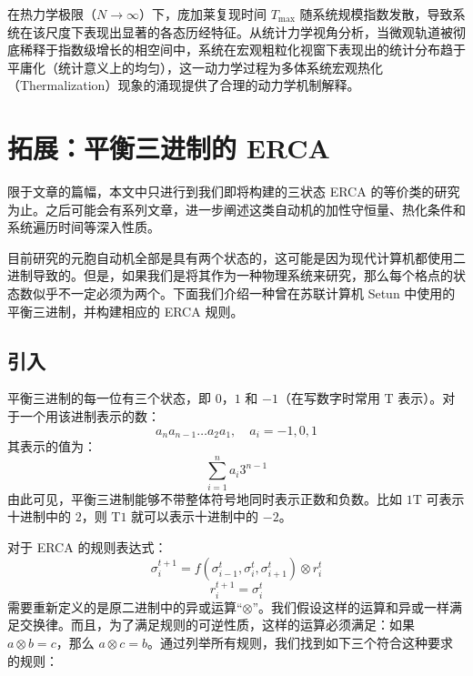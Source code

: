 \documentclass[reprint, amsmath, amssymb, aps, physrev,prb]{revtex4-2}
\begin{document}
在热力学极限（$N \to \infty$）下，庞加莱复现时间 $T_{\text{max}}$ 随系统规模指数发散，导致系统在该尺度下表现出显著的各态历经特征。从统计力学视角分析，当微观轨道被彻底稀释于指数级增长的相空间中，系统在宏观粗粒化视窗下表现出的统计分布趋于平庸化（统计意义上的均匀），这一动力学过程为多体系统宏观热化（Thermalization）现象的涌现提供了合理的动力学机制解释。



\section{拓展：平衡三进制的 ERCA}

限于文章的篇幅，本文中只进行到我们即将构建的三状态 ERCA 的等价类的研究为止。之后可能会有系列文章，进一步阐述这类自动机的加性守恒量、热化条件和系统遍历时间等深入性质。

目前研究的元胞自动机全部是具有两个状态的，这可能是因为现代计算机都使用二进制导致的。但是，如果我们是将其作为一种物理系统来研究，那么每个格点的状态数似乎不一定必须为两个。下面我们介绍一种曾在苏联计算机 Setun 中使用的平衡三进制，并构建相应的 ERCA 规则\cite{Setun,VICHNIAC198496}。

\subsection{引入}

平衡三进制的每一位有三个状态，即 $0$，$1$ 和 $-1$（在写数字时常用 $\mathrm{T}$ 表示）。对于一个用该进制表示的数：
\begin{equation}
a_n a_{n-1} \dots a_2 a_1, \quad a_i = -1, 0, 1
\end{equation}
其表示的值为：
\begin{equation}
\sum_{i=1}^n a_i 3^{n-1}
\end{equation}
由此可见，平衡三进制能够不带整体符号地同时表示正数和负数。比如 $1\mathrm{T}$ 可表示十进制中的 $2$，则 $\mathrm{T}1$ 就可以表示十进制中的 $-2$。

对于 ERCA 的规则表达式：
\begin{equation}
\sigma_i^{t+1} = f(\sigma_{i-1}^t, \sigma_{i}^t, \sigma_{i+1}^t) \otimes r_i^t
\end{equation}
\begin{equation}
r_i^{t+1} = \sigma_i^t
\end{equation}
需要重新定义的是原二进制中的异或运算“$\otimes$”。我们假设这样的运算和异或一样满足交换律。而且，为了满足规则的可逆性质，这样的运算必须满足：如果 $a \otimes b = c$，那么 $a \otimes c = b$。通过列举所有规则，我们找到如下三个符合这种要求的规则：
\end{document}
